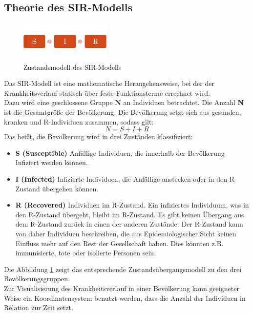 \subsection*{Theorie des SIR-Modells}
\begin{figure}[b]
	\centering
\includegraphics[width= 0.4\textwidth]{./images/SIR-Modell.jpg}\caption{Zustandsmodell des SIR-Modells}\label{fig:SIR}
\end{figure}
Das SIR-Modell ist eine mathematische Herangehensweise, bei der der Krankheitsverlauf statisch über feste Funktionsterme errechnet wird. \\
Dazu wird eine geschlossene Gruppe \textbf{N} an Individuen betrachtet. Die Anzahl \textbf{N} ist die Gesamtgröße der Bevölkerung. Die Bevölkerung setzt sich aus gesunden, kranken und \glqq R\grqq-Individuen zusammen, sodass gilt:
\begin{equation}\label{eq:N}
N = S + I + R
\end{equation}
Das heißt, die Bevölkerung wird in drei Zuständen klassifiziert:
\begin{itemize}
\item \textbf{S (Susceptible)} Anfällige Individuen, die innerhalb der Bevölkerung Infiziert werden können.
\item \textbf{I (Infected)} Infizierte Individuen, die Anfällige anstecken  oder in den \glqq R\grqq -Zustand übergehen können.
\item \textbf{R (Recovered)} Individuen im \glqq R\grqq -Zustand. Ein infiziertes Individuum, was in den \glqq R\grqq -Zustand übergeht, bleibt im R-Zustand. Es gibt keinen Übergang aus dem \glqq R\grqq -Zustand zurück in einen der anderen Zustände. Der \glqq R\grqq -Zustand kann von daher Individuen beschreiben, die aus Epidemiologischer Sicht keinen Einfluss mehr auf den Rest der Gesellschaft haben. Dies könnten z.B. immunisierte, tote oder isolierte Personen sein.
\end{itemize}
Die Abbildung \ref{fig:SIR} zeigt das entsprechende Zustandsübergangsmodell zu den drei Bevölkerungsgruppen.\\
Zur Visualisierung des Krankheitsverlauf in einer Bevölkerung kann geeigneter Weise ein Koordinatensystem benutzt werden, dass die Anzahl der Individuen in Relation zur Zeit setzt.
